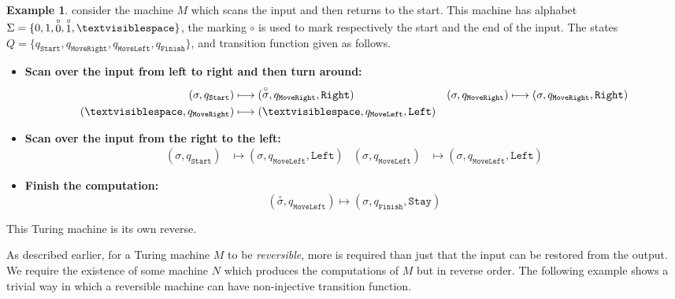 \documentclass[12pt]{article}
\theoremstyle{plain}
\theoremstyle{definition}
\newtheorem{example}[thm]{Example}
\newcommand{\blank}{\textvisiblespace}
\begin{document}
	\begin{example}
		consider the machine $M$ which scans the input and then returns to the start. This machine has alphabet $\Sigma = \{0, 1, \stackrel{\circ}{0}, \stackrel{\circ}{1}, \blank\}$, the marking $\circ$ is used to mark respectively the start and the end of the input. The states $Q = \{q_{\texttt{Start}}, q_{\texttt{MoveRight}}, q_{\texttt{MoveLeft}}, q_{\texttt{Finish}}\}$, and transition function given as follows.
		\begin{itemize}
			\item \textbf{Scan over the input from left to right and then turn around: }
			\begin{align*}
				(\sigma, q_{\texttt{Start}}) &\longmapsto (\stackrel{\circ}{\sigma}, q_{\texttt{MoveRight}}, \texttt{Right}) & (\sigma, q_{\texttt{MoveRight}}) &\longmapsto (\sigma, q_{\texttt{MoveRight}}, \texttt{Right})\\
				(\blank, q_{\texttt{MoveRight}}) &\longmapsto (\blank, q_{\texttt{MoveLeft}}, \texttt{Left})
			\end{align*}
			\item \textbf{Scan over the input from the right to the left:}
			\begin{align*}
				(\sigma, q_{\texttt{Start}}) &\longmapsto (\sigma, q_{\texttt{MoveLeft}}, \texttt{Left}) & (\sigma, q_{\texttt{MoveLeft}}) &\longmapsto (\sigma, q_{\texttt{MoveLeft}}, \texttt{Left})
			\end{align*}
			\item \textbf{Finish the computation: }
			\begin{equation}
				(\stackrel{\circ}{\sigma}, q_{\texttt{MoveLeft}}) \longmapsto (\sigma, q_{\texttt{Finish}}, \texttt{Stay})
			\end{equation}
		\end{itemize}
		This Turing machine is its own reverse.
		\end{example}
	As described earlier, for a Turing machine $M$ to be \emph{reversible}, more is required than just that the input can be restored from the output. We require the existence of some machine $N$ which produces the computations of $M$ but in reverse order. The following example shows a trivial way in which a reversible machine can have non-injective transition function.
\end{document}
